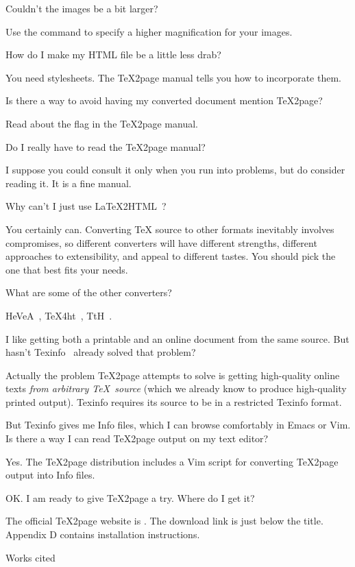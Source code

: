 {\question Couldn't the images be a bit larger?}

Use the \p{\imgpreamble} command to specify a higher
magnification for your images.

{\question How do I make my HTML file be a little
less drab?}

You need stylesheets.  The \TeX2page manual tells you
how to incorporate them.

{\question Is there a way to avoid having my converted
document mention \TeX2page?}

Read about the \p{\TZPcolophoncredit} flag in the
\TeX2page manual.

{\question Do I really have to read the \TeX2page
manual?}

I suppose you could consult it only when you run into
problems, but do consider reading it.  It is a fine
manual.

{\question Why can't I just use \LaTeX2HTML~\cite{latex2html}?}

You certainly can.  Converting TeX source to other
formats inevitably involves compromises, so different
converters will have different strengths, different
approaches to extensibility, and
appeal to different tastes.  You should pick the one
that best fits your needs. 

{\question What are some of the other converters?}

HeVeA~\cite{hevea}, \TeX4ht~\cite{tex4ht}, TtH~\cite{tth}.

{\question I like getting both a 
printable and an online document from the same source.
But hasn't  Texinfo~\cite{texinfo} already solved that problem?}

Actually the problem \TeX2page attempts to solve is getting
high-quality online texts {\em from 
arbitrary \TeX\
source} (which we  already know to produce high-quality
printed output).  Texinfo requires its source to be in a
restricted Texinfo format.  

{\question But Texinfo gives me Info files, which I can
browse comfortably in Emacs or Vim.  Is there a way I
can read \TeX2page output on my text editor?}

Yes.  The \TeX2page distribution includes a Vim script 
for converting \TeX2page output
into Info files.

{\question OK.  I am ready to give \TeX2page a try.
Where do I get it?}

The official \TeX2page website is
.
The download link is just below the title.  Appendix D
contains installation instructions.

\beginsection Works cited




\bye
